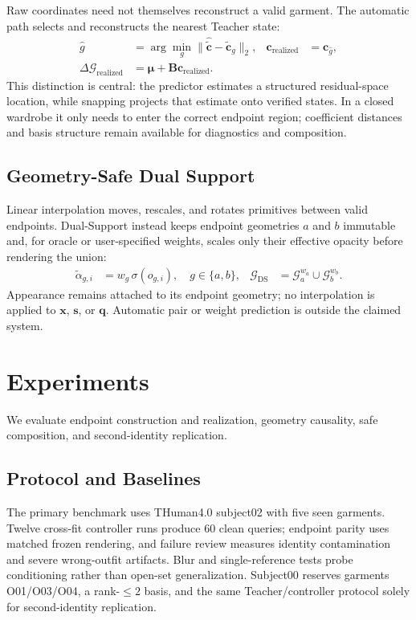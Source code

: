\documentclass[letterpaper]{article}
\newcommand{\dual}{Dual-Support}
\begin{document}
Raw coordinates need not themselves reconstruct a valid garment. The automatic path selects and reconstructs the nearest Teacher state:
\begin{align}
\widehat g&=\arg\min_g\|\widehat{\widetilde{\mathbf c}}-\widetilde{\mathbf c}_g\|_2, &
\mathbf c_{\mathrm{realized}}&=\mathbf c_{\widehat g},\nonumber\\
\Delta\mathcal G_{\mathrm{realized}}&=\boldsymbol{\mu}+\mathbf B\mathbf c_{\mathrm{realized}}.
\label{eq:snap}
\end{align}
This distinction is central: the predictor estimates a structured residual-space location, while snapping projects that estimate onto verified states. In a closed wardrobe it only needs to enter the correct endpoint region; coefficient distances and basis structure remain available for diagnostics and composition.

\subsection{Geometry-Safe Dual Support}

Linear interpolation moves, rescales, and rotates primitives between valid endpoints. \dual{} instead keeps endpoint geometries $a$ and $b$ immutable and, for oracle or user-specified weights, scales only their effective opacity before rendering the union:
\begin{align}
\widetilde{\alpha}_{g,i}&=w_g\,\sigma(o_{g,i}),\quad g\in\{a,b\}, &
\mathcal G_{\mathrm{DS}}&=\mathcal G_a^{w_a}\cup\mathcal G_b^{w_b}.
\label{eq:dual}
\end{align}
Appearance remains attached to its endpoint geometry; no interpolation is applied to $\mathbf{x}$, $\mathbf{s}$, or $\mathbf{q}$. Automatic pair or weight prediction is outside the claimed system.

\section{Experiments}

We evaluate endpoint construction and realization, geometry causality, safe composition, and second-identity replication.

\subsection{Protocol and Baselines}

The primary benchmark uses THuman4.0 subject02 with five seen garments. Twelve cross-fit controller runs produce 60 clean queries; endpoint parity uses matched frozen rendering, and failure review measures identity contamination and severe wrong-outfit artifacts. Blur and single-reference tests probe conditioning rather than open-set generalization. Subject00 reserves garments O01/O03/O04, a rank-$\leq2$ basis, and the same Teacher/controller protocol solely for second-identity replication.
\end{document}
